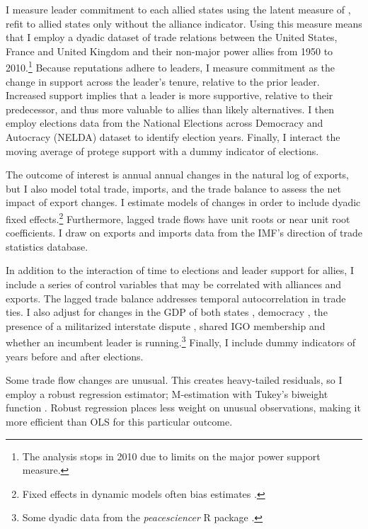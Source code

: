 \documentclass[12pt]{article}
\begin{document}
I measure leader commitment to each allied states using the latent measure of \citet{McManusNieman2019}, refit to allied states only without the alliance indicator. 
Using this measure means that I employ a dyadic dataset of trade relations between the United States, France and United Kingdom and their non-major power allies from 1950 to 2010.\footnote{The analysis stops in 2010 due to limits on the major power support measure.}
Because reputations adhere to leaders, I measure commitment as the change in support across the leader's tenure, relative to the prior leader. 
Increased support implies that a leader is more supportive, relative to their predecessor, and thus more valuable to allies than likely alternatives.
I then employ elections data from the National Elections across Democracy and Autocracy (NELDA) dataset \citep{HydeMarinov2012} to identify election years.
Finally, I interact the moving average of protege support with a dummy indicator of elections.


The outcome of interest is annual annual changes in the natural log of exports, but I also model total trade, imports, and the trade balance to assess the net impact of export changes.
I estimate models of changes in order to include dyadic fixed effects.\footnote{Fixed effects in dynamic models often bias estimates \citep{Nickell1981}.}
Furthermore, lagged trade flows have unit roots or near unit root coefficients.
I draw on exports and imports data from the IMF's direction of trade statistics database.


In addition to the interaction of time to elections and leader support for allies, I include a series of control variables that may be correlated with alliances and exports. 
The lagged trade balance addresses temporal autocorrelation in trade ties.
I also adjust for changes in the GDP of both states \citep{FouquinHugot2016}, democracy \citep{Marquez2016}, the presence of a militarized interstate dispute \citep{Gibleretal2016}, shared IGO membership \citep{Pevehouseetal2020} and whether an incumbent leader is running.\footnote{Some dyadic data from the \textit{peacesciencer} \textsf{R} package \citep{peacesciencer-package}.}
Finally, I include dummy indicators of years before and after elections.


Some trade flow changes are unusual. 
This creates heavy-tailed residuals, so I employ a robust regression estimator; M-estimation with Tukey's biweight function \citep{RaineyBaissa2020}.
Robust regression places less weight on unusual observations, making it more efficient than OLS for this particular outcome.
\end{document}
